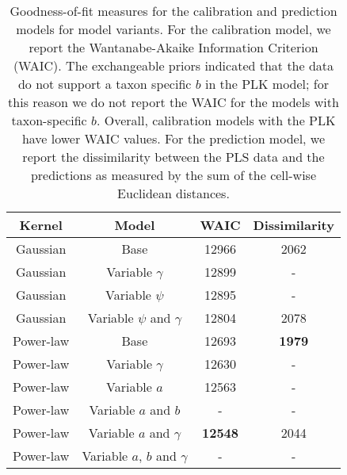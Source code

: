 \begin{table}
  \caption[]{\internallinenumbers \doublespacing Goodness-of-fit measures for the
    calibration and prediction models for model variants. For the
    calibration model, we report the Wantanabe-Akaike Information
    Criterion (WAIC). The exchangeable priors indicated that the data
    do not support a taxon specific $b$ in the PLK model; for this
    reason we do not report the WAIC for the models with
    taxon-specific $b$. Overall, calibration models with the PLK have
    lower WAIC values. For the prediction model, we report the
    dissimilarity between the PLS data and the predictions as measured
    by the sum of the cell-wise Euclidean distances.}
\begin{center}
\begin{tabular}{cccc} 
\toprule
Kernel    & Model                          & WAIC           & Dissimilarity \\ \midrule
Gaussian  & Base                           & 12966          & 2062 \\
Gaussian  & Variable $\gamma$              & 12899          &  -   \\
Gaussian  & Variable $\psi$                & 12895          &  -   \\   
Gaussian  & Variable $\psi$ and $\gamma$   & 12804          & 2078 \\
Power-law & Base                           & 12693          & \textbf{1979} \\
Power-law & Variable $\gamma$              & 12630          &  -   \\
Power-law & Variable $a$                   & 12563          &  -   \\
Power-law & Variable $a$ and $b$           & -              &  -   \\
Power-law & Variable $a$ and $\gamma$      & \textbf{12548} & 2044 \\  
Power-law & Variable $a$, $b$ and $\gamma$ & -              &  -   \\
\bottomrule
\end{tabular}
\label{table:GOF}
\end{center}
\vspace{2cm}
\end{table}

